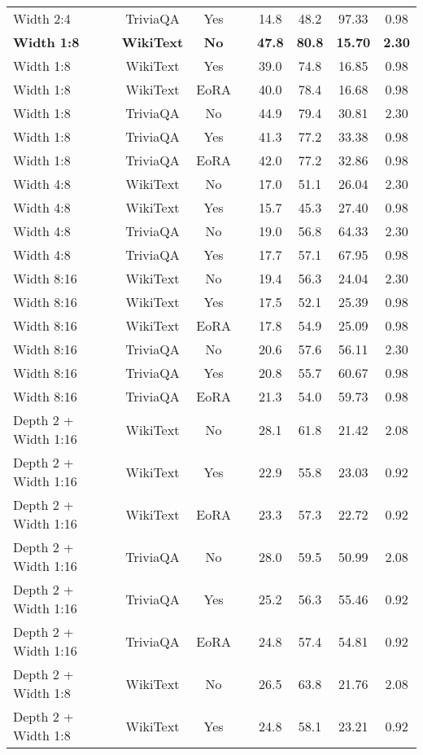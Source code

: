 \begin{longtable}{lcclcccc}
Width 2:4 & TriviaQA & Yes & & 14.8 & 48.2 & 97.33 & 0.98 \\
\textbf{Width 1:8} & \textbf{WikiText} & \textbf{No} & & \textbf{47.8} & \textbf{80.8} & \textbf{15.70} & \textbf{2.30} \\
Width 1:8 & WikiText & Yes & & 39.0 & 74.8 & 16.85 & 0.98 \\
Width 1:8 & WikiText & EoRA & & 40.0 & 78.4 & 16.68 & 0.98 \\
Width 1:8 & TriviaQA & No & & 44.9 & 79.4 & 30.81 & 2.30 \\
Width 1:8 & TriviaQA & Yes & & 41.3 & 77.2 & 33.38 & 0.98 \\
Width 1:8 & TriviaQA & EoRA & & 42.0 & 77.2 & 32.86 & 0.98 \\
Width 4:8 & WikiText & No & & 17.0 & 51.1 & 26.04 & 2.30 \\
Width 4:8 & WikiText & Yes & & 15.7 & 45.3 & 27.40 & 0.98 \\
Width 4:8 & TriviaQA & No & & 19.0 & 56.8 & 64.33 & 2.30 \\
Width 4:8 & TriviaQA & Yes & & 17.7 & 57.1 & 67.95 & 0.98 \\
Width 8:16 & WikiText & No & & 19.4 & 56.3 & 24.04 & 2.30 \\
Width 8:16 & WikiText & Yes & & 17.5 & 52.1 & 25.39 & 0.98 \\
Width 8:16 & WikiText & EoRA & & 17.8 & 54.9 & 25.09 & 0.98 \\
Width 8:16 & TriviaQA & No & & 20.6 & 57.6 & 56.11 & 2.30 \\
Width 8:16 & TriviaQA & Yes & & 20.8 & 55.7 & 60.67 & 0.98 \\
Width 8:16 & TriviaQA & EoRA & & 21.3 & 54.0 & 59.73 & 0.98 \\
Depth 2 + Width 1:16 & WikiText & No & & 28.1 & 61.8 & 21.42 & 2.08 \\
Depth 2 + Width 1:16 & WikiText & Yes & & 22.9 & 55.8 & 23.03 & 0.92 \\
Depth 2 + Width 1:16 & WikiText & EoRA & & 23.3 & 57.3 & 22.72 & 0.92 \\
Depth 2 + Width 1:16 & TriviaQA & No & & 28.0 & 59.5 & 50.99 & 2.08 \\
Depth 2 + Width 1:16 & TriviaQA & Yes & & 25.2 & 56.3 & 55.46 & 0.92 \\
Depth 2 + Width 1:16 & TriviaQA & EoRA & & 24.8 & 57.4 & 54.81 & 0.92 \\
Depth 2 + Width 1:8 & WikiText & No & & 26.5 & 63.8 & 21.76 & 2.08 \\
Depth 2 + Width 1:8 & WikiText & Yes & & 24.8 & 58.1 & 23.21 & 0.92 \\

\end{longtable}
